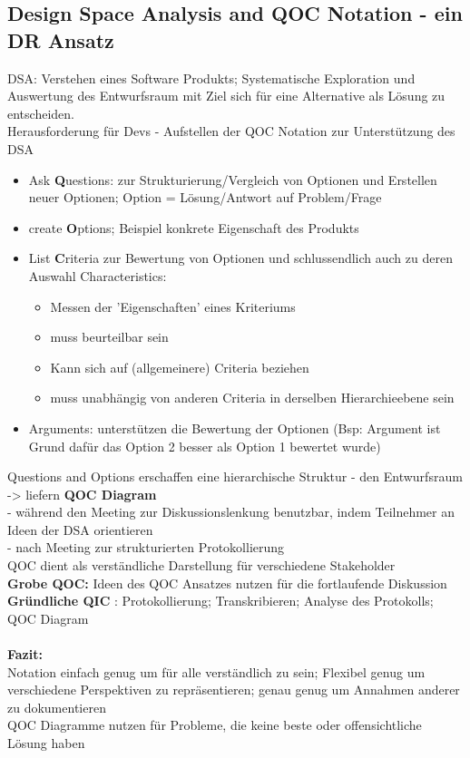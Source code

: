 \subsection{Design Space Analysis and QOC Notation - ein DR Ansatz}
DSA: Verstehen eines Software Produkts; Systematische Exploration und Auswertung des Entwurfsraum mit Ziel sich für eine Alternative als Lösung zu entscheiden.\\
Herausforderung für Devs - Aufstellen der QOC Notation zur Unterstützung des DSA\\
\begin{itemize}
	\item Ask \textbf{Q}uestions: zur Strukturierung/Vergleich von Optionen und Erstellen neuer Optionen; Option = Lösung/Antwort auf Problem/Frage
	\item create \textbf{O}ptions; Beispiel konkrete Eigenschaft des Produkts
	\item List \textbf{C}riteria zur Bewertung von Optionen und schlussendlich auch zu deren Auswahl
	Characteristics:
	\begin{itemize}
		\item Messen der 'Eigenschaften' eines Kriteriums
		\item muss beurteilbar sein
		\item Kann sich auf (allgemeinere) Criteria beziehen
		\item muss unabhängig von anderen Criteria in derselben Hierarchieebene sein 
	\end{itemize}
	\item Arguments: unterstützen die Bewertung der Optionen (Bsp: Argument ist Grund dafür das Option 2 besser als Option 1 bewertet wurde)
\end{itemize}
Questions and Options erschaffen eine hierarchische Struktur - den Entwurfsraum -> liefern \textbf{QOC Diagram}\\
- während den Meeting zur Diskussionslenkung benutzbar, indem Teilnehmer an Ideen der DSA orientieren\\
- nach Meeting zur strukturierten Protokollierung\\
QOC dient als verständliche Darstellung für verschiedene Stakeholder\\
\textbf{Grobe QOC:} Ideen des QOC Ansatzes nutzen für die fortlaufende Diskussion\\
\textbf{Gründliche QIC} : Protokollierung; Transkribieren; Analyse des Protokolls; QOC Diagram\\
\\
\textbf{Fazit:}\\
Notation einfach genug um für alle verständlich zu sein; Flexibel genug um verschiedene Perspektiven zu repräsentieren; genau genug um Annahmen anderer zu dokumentieren\\
QOC Diagramme nutzen für Probleme, die keine beste oder offensichtliche Lösung haben
